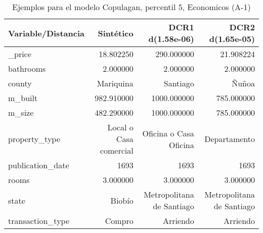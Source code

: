 \begin{table}[H]
\centering
\fontsize{10}{14}\selectfont
\caption{Ejemplos para el modelo Copulagan, percentil 5, Economicos (A-1)}
\label{table-example-economicos-a-1-copulagan-5p}
\begin{tabular}{|l|r|r|r|}
\hline
\rowcolor[gray]{0.8}
Variable/Distancia & Sintético & DCR1 d(1.58e-06) & DCR2 d(1.65e-05) \\
\hline \_price & \cellcolor[rgb]{0.9, 0.54, 0.52} 18.802250 & 290.000000 & 21.908224 \\
\hline bathrooms & \cellcolor[rgb]{0.9, 0.54, 0.52} 2.000000 & \cellcolor[rgb]{0.9, 0.54, 0.52} 2.000000 & \cellcolor[rgb]{0.9, 0.54, 0.52} 2.000000 \\
\hline county & \cellcolor[rgb]{0.9, 0.54, 0.52} Mariquina & Santiago & Ñuñoa \\
\hline m\_built & \cellcolor[rgb]{0.9, 0.54, 0.52} 982.910000 & 1000.000000 & 785.000000 \\
\hline m\_size & \cellcolor[rgb]{0.9, 0.54, 0.52} 482.290000 & 1000.000000 & 785.000000 \\
\hline property\_type & \cellcolor[rgb]{0.9, 0.54, 0.52} Local o Casa comercial & Oficina o Casa Oficina & Departamento \\
\hline publication\_date & \cellcolor[rgb]{0.9, 0.54, 0.52} 1693 & \cellcolor[rgb]{0.9, 0.54, 0.52} 1693 & \cellcolor[rgb]{0.9, 0.54, 0.52} 1693 \\
\hline rooms & \cellcolor[rgb]{0.9, 0.54, 0.52} 3.000000 & \cellcolor[rgb]{0.9, 0.54, 0.52} 3.000000 & \cellcolor[rgb]{0.9, 0.54, 0.52} 3.000000 \\
\hline state & \cellcolor[rgb]{0.9, 0.54, 0.52} Biobío & Metropolitana de Santiago & Metropolitana de Santiago \\
\hline transaction\_type & \cellcolor[rgb]{0.9, 0.54, 0.52} Compro & Arriendo & Arriendo \\
\hline
\end{tabular}
\end{table}
